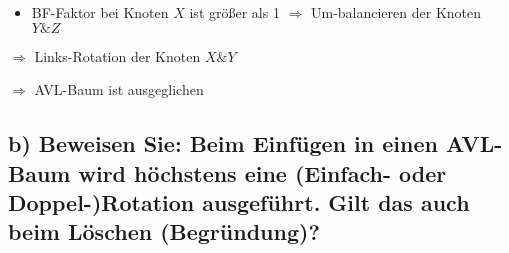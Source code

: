 \begin{multicols}{2}
\begin{enumerate}
\begin{itemize}
	\item BF-Faktor bei Knoten $X$ ist größer als 1 $\Rightarrow$ Um-balancieren der Knoten $Y\&Z$
\end{itemize}

$\Rightarrow$ Links-Rotation der Knoten $X\&Y$


$\Rightarrow$ AVL-Baum ist ausgeglichen

\end{enumerate}
\end{multicols}

\subsection*{b) Beweisen Sie: Beim Einfügen in einen AVL-Baum wird höchstens eine (Einfach- oder Doppel-)Rotation ausgeführt. Gilt das auch beim Löschen (Begründung)?} 